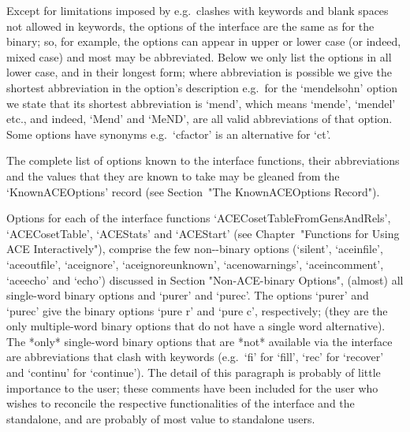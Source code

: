Except for limitations imposed by {\GAP}  e.g.\  clashes  with  {\GAP}
keywords and blank spaces not allowed in keywords, the options of  the
{\ACE} interface are the same as for the binary; so, for example,  the
options can appear in upper or lower case (or indeed, mixed case)  and
most may be abbreviated. Below we only list the options in  all  lower
case, and in their longest form; where  abbreviation  is  possible  we
give the shortest abbreviation in the  option's  description  e.g.~for
the `mendelsohn' option we state that  its  shortest  abbreviation  is
`mend', which means `mende', `mendel' etc.,  and  indeed,  `Mend'  and
`MeND', are all valid abbreviations of that option. Some options  have
synonyms e.g.~`cfactor' is an alternative for `ct'.

The complete list of {\ACE} options  known  to  the  {\ACE}  interface
functions, their abbreviations and the values that they are  known  to
take  may  be  gleaned  from   the   `KnownACEOptions'   record   (see
Section~"The KnownACEOptions Record").

Options  for each of  the       {\ACE}       interface       functions
`ACECosetTableFromGensAndRels',   `ACECosetTable',   `ACEStats'    and
`ACEStart' (see  Chapter~"Functions  for  Using  ACE  Interactively"),
comprise the few  non-{\ACE}-binary  options  (`silent',  `aceinfile',
`aceoutfile',   `aceignore',   `aceignoreunknown',    `acenowarnings',
`aceincomment',     `aceecho'     and     `echo')     discussed     in
Section "Non-ACE-binary  Options",  (almost)  all  single-word  {\ACE}
binary options and  `purer'  and  `purec'.  The  options  `purer'  and
`purec' give  the  {\ACE}  binary  options  `pure  r'  and  `pure  c',
respectively; (they are the only multiple-word {\ACE}  binary  options
that do not have a single word alternative).  The  *only*  single-word
{\ACE}  binary  options  that  are  *not*  available  via  the  {\ACE}
interface are abbreviations that clash with {\GAP} keywords (e.g.~`fi'
for `fill', `rec' for `recover' and  `continu'  for  `continue').  The
detail of this paragraph is  probably  of  little  importance  to  the
{\GAP} user; these comments have been included for the user who wishes
to reconcile the respective functionalities of  the  {\ACE}  interface
and  the  {\ACE}  standalone,  and  are  probably  of  most  value  to
standalone users.


